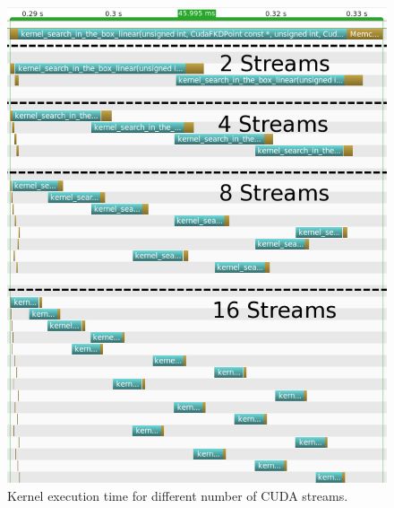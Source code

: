 \begin{figure}
\includegraphics[width=\textwidth]{fkdtree/nvvp_streams.png}
\caption{Kernel execution time for different number of CUDA streams.}
\label{nvvp_streams}
\end{figure}

